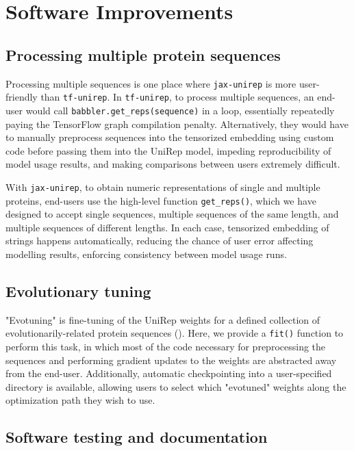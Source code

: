 \documentclass{bioinfo}
\begin{document}
\section{Software Improvements}

\subsection{Processing multiple protein sequences}

Processing multiple sequences is one place where \verb|jax-unirep|
is more user-friendly than \verb|tf-unirep|.
In \verb|tf-unirep|, to process multiple sequences,
an end-user would call \verb|babbler.get_reps(sequence)| in a loop,
essentially repeatedly paying the TensorFlow graph compilation penalty.
Alternatively, they would have to manually preprocess sequences
into the tensorized embedding using custom code
before passing them into the UniRep model,
impeding reproducibility of model usage results,
and making comparisons between users extremely difficult.

With \verb|jax-unirep|,
to obtain numeric representations of single and multiple proteins,
end-users use the high-level function \verb|get_reps()|,
which we have designed to accept single sequences,
multiple sequences of the same length, and
multiple sequences of different lengths.
In each case, tensorized embedding of strings happens automatically,
reducing the chance of user error affecting modelling results,
enforcing consistency between model usage runs.

\subsection{Evolutionary tuning}

"Evotuning" is fine-tuning of the UniRep weights
for a defined collection
of evolutionarily-related protein sequences (\cite{alley2019unified}).
Here, we provide a \verb|fit()| function to perform this task,
in which most of the code necessary for preprocessing the sequences
and performing gradient updates to the weights
are abstracted away from the end-user.
Additionally, automatic checkpointing
into a user-specified directory is available,
allowing users to select
which "evotuned" weights along the optimization path
they wish to use.

\subsection{Software testing and documentation}
\end{document}

